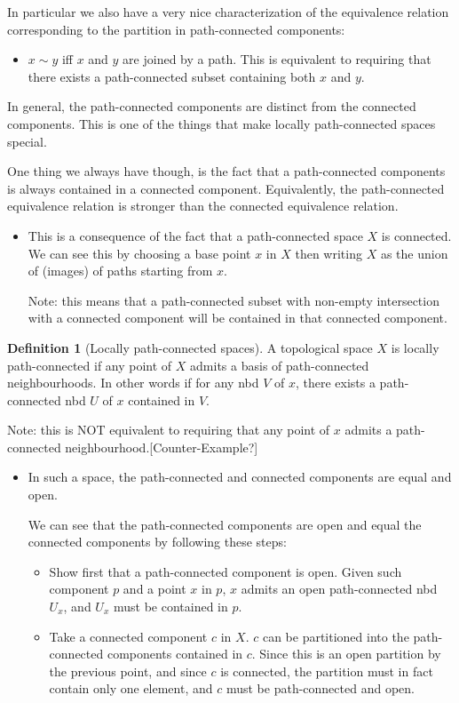 \documentclass{report}
\theoremstyle{definition}
\newtheorem{definition}{Definition}
\begin{document}
In particular we also have a very nice characterization of the equivalence relation corresponding to the partition in path-connected components:
\begin{itemize}
    \item $x\sim y$ iff $x$ and $y$ are joined by a path. This is equivalent to requiring that there exists a path-connected subset containing both $x$ and $y$.
\end{itemize}

In general, the path-connected components are distinct from the connected components. This is one of the things that make locally path-connected spaces special.

One thing we always have though, is the fact that a path-connected components is always contained in a connected component. Equivalently, the path-connected equivalence relation is stronger than the connected equivalence relation.
\begin{itemize}
    \item This is a consequence of the fact that a path-connected space $X$ is connected. We can see this by choosing a base point $x$ in $X$ then writing $X$ as the union of (images) of paths starting from $x$.

    Note: this means that a path-connected subset with non-empty intersection with a connected component will be contained in that connected component.
\end{itemize}


\begin{definition}[Locally path-connected spaces]
    A topological space $X$ is locally path-connected if any point of $X$ admits a basis of path-connected neighbourhoods. In other words if for any nbd $V$ of $x$, there exists a path-connected nbd $U$ of $x$ contained in $V$.

    Note: this is NOT equivalent to requiring that any point of $x$ admits a path-connected neighbourhood.[Counter-Example?]
\end{definition}

\begin{itemize}
    \item In such a space, the path-connected and connected components are equal and open.

    We can see that the path-connected components are open and equal the connected components by following these steps:
    \begin{itemize}
        \item Show first that a path-connected component is open. Given such component $p$ and a point $x$ in $p$, $x$ admits an open path-connected nbd $U_x$, and $U_x$ must be contained in $p$.
        \item Take a connected component $c$ in $X$. $c$ can be partitioned into the path-connected components contained in $c$. Since this is an open partition by the previous point, and since $c$ is connected, the partition must in fact contain only one element, and $c$ must be path-connected and open.
    \end{itemize}
\end{itemize}
\end{document}

